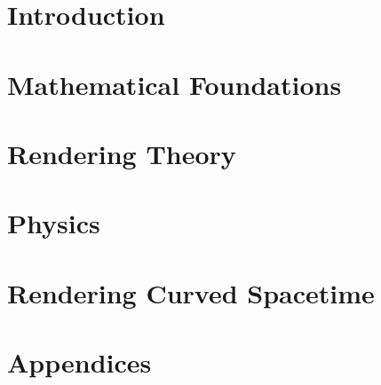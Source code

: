 \part{Introduction}


\part{Mathematical Foundations}







\part{Rendering Theory}




\part{Physics}












\part{Rendering Curved Spacetime}





\appendix
\part{Appendices}





